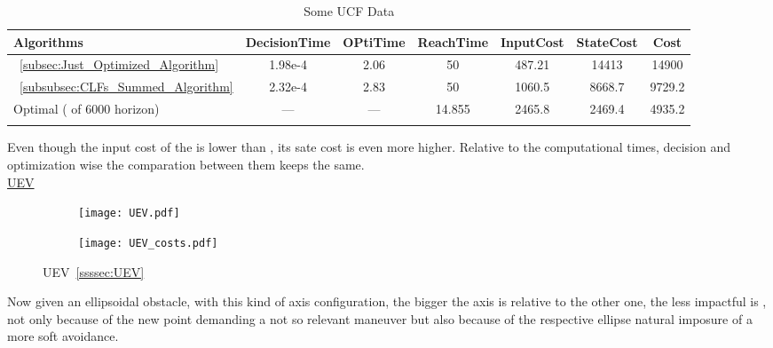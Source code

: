   \bgroup
 \begin{xltabular}{\textwidth}{|l|cccccc|}
   \toprule
   Algorithms   & DecisionTime & OPtiTime & ReachTime  & InputCost   & StateCost & Cost           \\
   \midrule
    ~\ref{subsec:Just_Optimized_Algorithm}           & 1.98e-4 & 2.06 & 50 & 487.21 & 14413 & 14900 \\
    ~\ref{subsubsec:CLFs_Summed_Algorithm}        & 2.32e-4 & 2.83 & 50 & 1060.5 & 8668.7 & 9729.2 \\
    Optimal ( of 6000 horizon)                        & ---     & ---  & 14.855  & 2465.8  & 2469.4 & 4935.2 \\
    \midrule
    \caption{Some UCF Data}
    \label{tab:Some_UCF_Data}\\
   \end{xltabular}
 \egroup

Even though the input cost of the  is lower than , its sate cost is even more higher. Relative to the computational times, decision and optimization wise the comparation between them keeps the same. \\


\underline{UEV}
\label{ssssec:UEV_experiments} %

 \begin{figure}[htbp]
  \begin{subfigure}{0.5\textwidth}
    \centering
    \texttt{[image: UEV.pdf]}
  \label{fig:UEV_CostEvol}
  \end{subfigure}
  \begin{subfigure}{0.6\textwidth}
    \centering
    \texttt{[image: UEV\_costs.pdf]}
  \label{fig:UEV_trajectory}
  \end{subfigure}
  \caption{UEV~\ref{ssssec:UEV}}
\label{fig:UEVTrajectory_and_CostEvol}
\end{figure}

Now given an ellipsoidal obstacle, with this kind of axis configuration, the bigger the axis is relative to the other one, the less impactful is , not only because of the new point demanding a not so relevant maneuver but also because of the respective ellipse  natural imposure of a more soft avoidance. 


